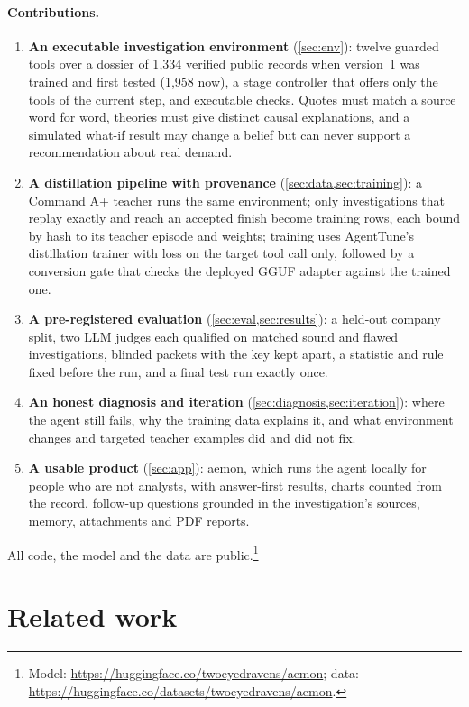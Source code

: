 \paragraph{Contributions.}
\begin{enumerate}
  \item \textbf{An executable investigation environment} (\cref{sec:env}): twelve guarded tools over a dossier of
        1{,}334 verified public records when version~1 was trained and first tested (1{,}958 now), a stage controller that offers only the tools of the current step, and
        executable checks. Quotes must match a source word for word, theories must give distinct causal explanations, and
        a simulated what-if result may change a belief but can never support a recommendation about real demand.
  \item \textbf{A distillation pipeline with provenance} (\cref{sec:data,sec:training}): a Command A+ teacher runs the
        same environment; only investigations that replay exactly and reach an accepted finish become training rows,
        each bound by hash to its teacher episode and weights; training uses AgentTune's distillation trainer with loss
        on the target tool call only, followed by a conversion gate that checks the deployed GGUF adapter against the
        trained one.
  \item \textbf{A pre-registered evaluation} (\cref{sec:eval,sec:results}): a held-out company split, two LLM judges
        each qualified on matched sound and flawed investigations, blinded packets with the key kept apart, a statistic
        and rule fixed before the run, and a final test run exactly once.
  \item \textbf{An honest diagnosis and iteration} (\cref{sec:diagnosis,sec:iteration}): where the agent still fails,
        why the training data explains it, and what environment changes and targeted teacher examples did and did not
        fix.
  \item \textbf{A usable product} (\cref{sec:app}): aemon, which runs the agent locally for people who are
        not analysts, with answer-first results, charts counted from the record, follow-up questions grounded in the
        investigation's sources, memory, attachments and PDF reports.
\end{enumerate}
All code, the model and the data are public.\footnote{Model:
\url{https://huggingface.co/twoeyedravens/aemon}; data:
\url{https://huggingface.co/datasets/twoeyedravens/aemon}.}

\section{Related work}\label{sec:related}
